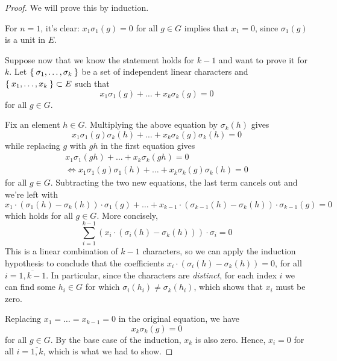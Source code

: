 \begin{proof}
We will prove this by induction.

For \(n = 1\), it's clear: \(x_1 \sigma_1 (g) = 0\) for all \(g \in G\) implies that \(x_1 = 0\), since \(\sigma_1 (g)\) is a unit in \(E\).

Suppose now that we know the statement holds for \(k - 1\) and want to prove it for \(k\). Let \(\Set{ \sigma_1, \dots, \sigma_k }\) be a set of independent linear characters and \(\Set{ x_1, \dots, x_k } \subset E\) such that
\[
    x_1 \sigma_1 (g) + \dots + x_k \sigma_k (g) = 0
\]
for all \(g \in G\).

Fix an element \(h \in G\). Multiplying the above equation by \(\sigma_{k} (h)\) gives
\[
    x_1 \sigma_1 (g) \sigma_k (h) + \dots + x_k \sigma_k (g) \sigma_k (h) = 0
\]
while replacing \(g\) with \(g h\) in the first equation gives
\begin{gather*}
    x_1 \sigma_1 (g h) + \dots + x_k \sigma_k (g h) = 0 \\
    \iff x_1 \sigma_1 (g) \sigma_1 (h) + \dots + x_k \sigma_k (g) \sigma_k (h) = 0
\end{gather*}
for all \(g \in G\). Subtracting the two new equations, the last term cancels out and we're left with
\[
    x_1 \cdot (\sigma_1 (h) - \sigma_k (h)) \cdot \sigma_1 (g) + \dots + x_{k - 1} \cdot (\sigma_{k - 1} (h) - \sigma_k(h)) \cdot \sigma_{k - 1} (g) = 0
\]
which holds for all \(g \in G\). More concisely,
\[
    \sum_{i = 1}^{k - 1} \left(x_i \cdot (\sigma_i (h) - \sigma_k (h))\right) \cdot \sigma_i = 0
\]
This is a linear combination of \(k - 1\) characters, so we can apply the induction hypothesis to conclude that the coefficients \(x_i \cdot (\sigma_i (h) - \sigma_k(h)) = 0\), for all \(i = \overline{1, k - 1}\). In particular, since the characters are \emph{distinct}, for each index \(i\) we can find some \(h_i \in G\) for which \(\sigma_{i} (h_i) \neq \sigma_{k} (h_i)\), which shows that \(x_i\) must be zero.

Replacing \(x_1 = \dots = x_{k - 1} = 0\) in the original equation, we have
\[
    x_k \sigma_k (g) = 0
\]
for all \(g \in G\). By the base case of the induction, \(x_k\) is also zero. Hence, \(x_i = 0\) for all \(i = \overline{1, k}\), which is what we had to show.
\end{proof}

